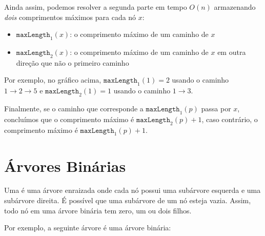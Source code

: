 Ainda assim, podemos resolver a segunda parte em tempo $O(n)$ armazenando \emph{dois} comprimentos máximos para cada nó $x$:
\begin{itemize}
\item $\texttt{maxLength}_1(x)$: o comprimento máximo de um caminho de $x$
\item $\texttt{maxLength}_2(x)$: o comprimento máximo de um caminho de $x$ em outra direção que não o primeiro caminho
\end{itemize}
Por exemplo, no gráfico acima, $\texttt{maxLength}_1(1)=2$ usando o caminho $1 \rightarrow 2 \rightarrow 5$ e $\texttt{maxLength}_2(1)=1$ usando o caminho $1 \rightarrow 3$.

Finalmente, se o caminho que corresponde a $\texttt{maxLength}_1(p)$ passa por $x$, concluímos que o comprimento máximo é $\texttt{maxLength}_2(p)+1$, caso contrário, o comprimento máximo é $\texttt{maxLength}_1(p)+1$.

\section{Árvores Binárias}


\begin{samepage}
Uma  é uma árvore enraizada onde cada nó possui uma subárvore esquerda e uma subárvore direita. É possível que uma subárvore de um nó esteja vazia. Assim, todo nó em uma árvore binária tem zero, um ou dois filhos.

Por exemplo, a seguinte árvore é uma árvore binária:
\begin{center}
\end{center}
\end{samepage}


